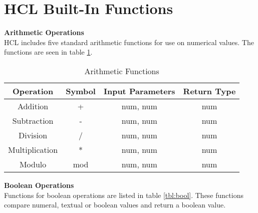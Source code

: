 \section{HCL Built-In Functions}
\label{builtinAppend}
\textbf{Arithmetic Operations}\\
HCL includes five standard arithmetic functions for use on numerical values.
The functions are seen in table \ref{tbl:arith}.

\begin{table}[h]
	\centering
	\caption{Arithmetic Functions}
	\label{tbl:arith}
	\begin{tabular}{|c|c|c|c|}
		\hline
		\textbf{Operation}      & \textbf{Symbol} & \textbf{Input Parameters} & \textbf{Return Type} \\ \hline
		Addition       & +      & num, num         & num         \\ \hline
		Subtraction    & -      & num, num         & num         \\ \hline
		Division       & /      & num, num         & num         \\ \hline
		Multiplication & *      & num, num         & num         \\ \hline
		Modulo         & mod    & num, num         & num         \\ \hline
	\end{tabular}
\end{table}

\textbf{Boolean Operations}\\
Functions for boolean operations are listed in table \ref{tbl:bool}.
These functions compare numeral, textual or boolean values and return a boolean value.


